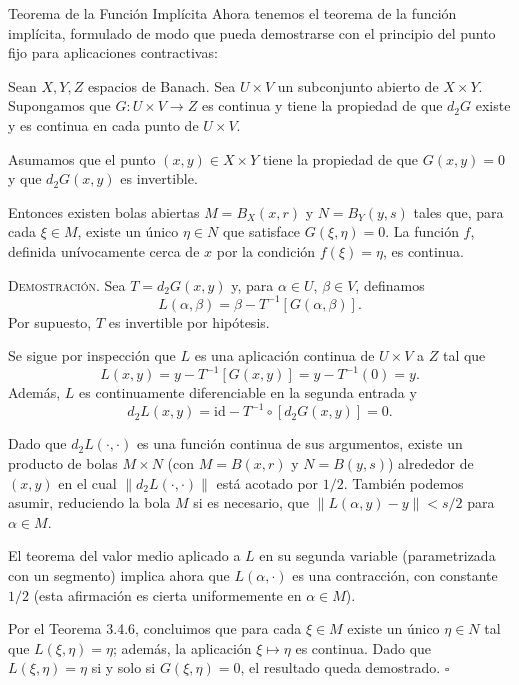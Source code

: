 \documentclass[10pt]{beamer}
\begin{document}
	\begin{frame}[allowframebreaks]{Teorema de la Función Implícita}
		Ahora tenemos el teorema de la función implícita, formulado de modo que pueda demostrarse con el principio del punto fijo para aplicaciones contractivas:
		
		\begin{theorem}[3.4.10]
			Sean $X, Y, Z$ espacios de Banach. Sea $U \times V$ un subconjunto abierto de $X \times Y$. Supongamos que $G : U \times V \to Z$ es continua y tiene la propiedad de que $d_2 G$ existe y es continua en cada punto de $U \times V$.
			
			Asumamos que el punto $(x, y) \in X \times Y$ tiene la propiedad de que $G(x, y) = 0$ y que $d_2 G(x, y)$ es invertible.
			
			Entonces existen bolas abiertas $M = B_X(x, r)$ y $N = B_Y(y, s)$ tales que, para cada $\xi \in M$, existe un único $\eta \in N$ que satisface $G(\xi, \eta) = 0$. La función $f$, definida unívocamente cerca de $x$ por la condición $f(\xi) = \eta$, es continua.
		\end{theorem}
		
		\framebreak
		
		\textsc{Demostración.} Sea $T = d_2 G(x, y)$ y, para $\alpha \in U$, $\beta \in V$, definamos
		\[ L(\alpha, \beta) = \beta - T^{-1}[G(\alpha, \beta)]. \]
		Por supuesto, $T$ es invertible por hipótesis.
		
		Se sigue por inspección que $L$ es una aplicación continua de $U \times V$ a $Z$ tal que
		\[ L(x, y) = y - T^{-1}[G(x, y)] = y - T^{-1}(0) = y. \]
		Además, $L$ es continuamente diferenciable en la segunda entrada y
		\[ d_2 L(x, y) = \text{id} - T^{-1} \circ [d_2 G(x, y)] = 0. \]
		
		\framebreak
		
		Dado que $d_2 L(\cdot, \cdot)$ es una función continua de sus argumentos, existe un producto de bolas $M \times N$ (con $M = B(x, r)$ y $N = B(y, s)$) alrededor de $(x, y)$ en el cual $\|d_2 L(\cdot, \cdot)\|$ está acotado por $1/2$. También podemos asumir, reduciendo la bola $M$ si es necesario, que $\|L(\alpha, y) - y\| < s/2$ para $\alpha \in M$.
		
		El teorema del valor medio aplicado a $L$ en su segunda variable (parametrizada con un segmento) implica ahora que $L(\alpha, \cdot)$ es una contracción, con constante $1/2$ (esta afirmación es cierta uniformemente en $\alpha \in M$). 
		
		Por el Teorema 3.4.6, concluimos que para cada $\xi \in M$ existe un único $\eta \in N$ tal que $L(\xi, \eta) = \eta$; además, la aplicación $\xi \mapsto \eta$ es continua. Dado que $L(\xi, \eta) = \eta$ si y solo si $G(\xi, \eta) = 0$, el resultado queda demostrado. \hfill $\square$
	\end{frame}
	
\end{document}
